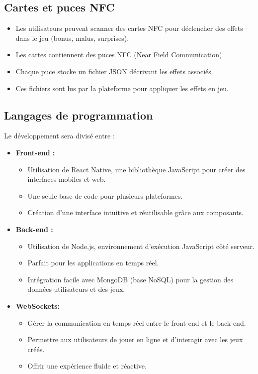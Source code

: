 \documentclass{article}                             %
\begin{document}
\subsection{Cartes et puces NFC}
\begin{itemize}[leftmargin=1.5em]
  \item Les utilisateurs peuvent scanner des cartes NFC pour déclencher des effets dans le jeu (bonus, malus, surprises).
  \item Les cartes contiennent des puces NFC (Near Field Communication).
  \item Chaque puce stocke un fichier JSON décrivant les effets associés.
  \item Ces fichiers sont lus par la plateforme pour appliquer les effets en jeu.
\end{itemize}

\subsection{Langages de programmation}
Le développement sera divisé entre :
    \begin{itemize}[leftmargin=1.5em]
      \item \textbf{Front-end :}
        \begin{itemize}[leftmargin=1.5em]
          \item Utilisation de React Native, une bibliothèque JavaScript pour créer des interfaces mobiles et web.
          \item Une seule base de code pour plusieurs plateformes.
          \item Création d'une interface intuitive et réutilisable grâce aux composants.
        \end{itemize}

      \item \textbf{Back-end :}
        \begin{itemize}[leftmargin=1.5em]
          \item Utilisation de Node.js, environnement d’exécution JavaScript côté serveur.
          \item Parfait pour les applications en temps réel.
          \item Intégration facile avec MongoDB (base NoSQL) pour la gestion des données utilisateurs et des jeux.
        \end{itemize}

      \item \textbf{WebSockets:}
        \begin{itemize}[leftmargin=1.5em]
          \item Gérer la communication en temps réel entre le front-end et le back-end.
          \item Permettre aux utilisateurs de jouer en ligne et d'interagir avec les jeux créés.
          \item Offrir une expérience fluide et réactive.
        \end{itemize}
    \end{itemize}
\end{document}
